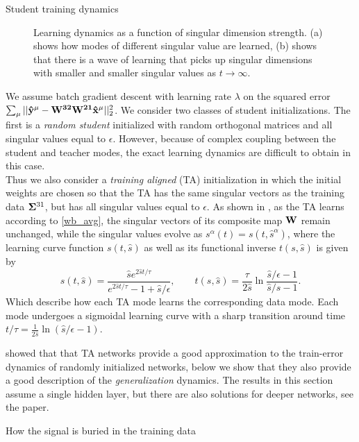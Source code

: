 \documentclass[final]{beamer}
\newcommand{\bh}[1]{{\bf\hat{#1}}}
\newcommand{\wa}{{\bf{W}^{21}}}
\newcommand{\wb}{{\bf{W}^{32}}}
\begin{document}
\begin{frame}[t]{}
\begin{columns}
\begin{column}{0.25\textwidth}
\begin{block}{\large Student training dynamics}
\begin{figure}[H]
\begin{subfigure}[t]{0.35\textwidth}
\label{s_of_t_b}
\end{subfigure}
\vspace{-1em}
\caption{Learning dynamics as a function of singular dimension strength. (a) shows how modes of different singular value are learned, (b) shows that there is a wave of learning that picks up singular dimensions with smaller and smaller singular values as \(t \rightarrow \infty\).}
\vspace{-0.5em}
\end{figure}
We assume batch gradient descent with learning rate $\lambda$ on the squared error $\sum_{\mu}||\bh{y}^\mu - \wb\wa \bh{x}^\mu||_2^2$. We consider two classes of student initializations.  The first is a {\it random student} initialized with random orthogonal matrices and all singular values equal to $\epsilon$. However, because of complex coupling between the student and teacher modes, the exact learning dynamics are difficult to obtain in this case. \\[0.5em]
Thus we also consider a {\it training aligned} (TA) initialization in which the initial weights are chosen so that the TA has the same singular vectors as the training data ${\bf \Sigma}^{31}$, but has all singular values equal to $\epsilon$.  As shown in \citep{Saxe2013}, as the TA learns according to \eqref{wb_avg}, the singular vectors of its composite map $\bf W$ remain unchanged, while the singular values evolve as $s^\alpha(t) = s(t,\hat s^\alpha)$, where the learning curve function $s(t,\hat s)$ as well as its functional inverse $t(s,\hat s)$ is given by 
\begin{equation}
s(t,\hat s)=\frac{\hat s e^{2\hat st/\tau}}{e^{2\hat st/\tau}-1+\hat s/\epsilon}, \qquad
t(s,\hat s) = \frac{\tau}{2\hat s} 
   \ln{\frac{{\hat s}/\epsilon -1}{{\hat s}/s -1}}.
\label{s_soln}
\end{equation}
Which describe how each TA mode learns the corresponding data mode. Each mode undergoes a sigmoidal learning curve with a sharp transition around time $t/\tau = \frac{1}{2\hat s}  \ln{({\hat s}/\epsilon -1)}$. \par 
\citet{Saxe2013} showed that that TA networks provide a good approximation to the train-error dynamics of randomly initialized networks, below we show that they also provide a good description of the \emph{generalization} dynamics. The results in this section assume a single hidden layer, but there are also solutions for deeper networks, see the paper.
\end{block}
\begin{block}{\large How the signal is buried in the training data}

\end{block}
\end{column}
\end{columns}
\end{frame}
\end{document}

